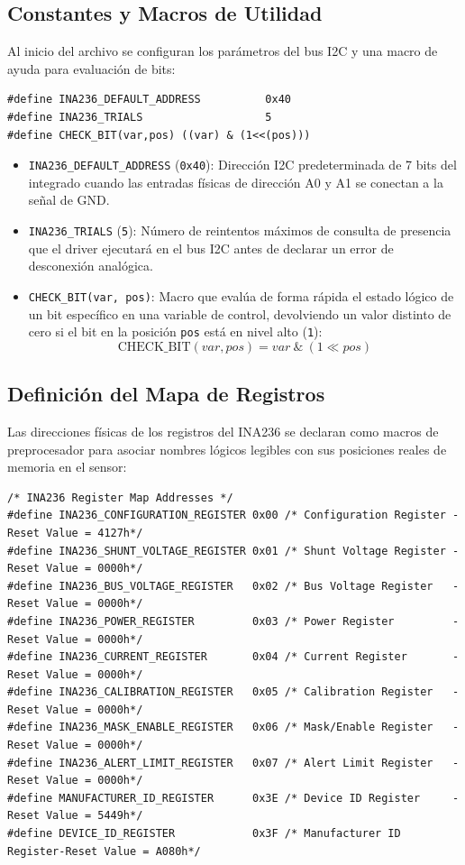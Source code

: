 \documentclass[
10pt, %
a4paper, %
oneside, %
headinclude,footinclude, %
BCOR5mm, %
]{scrartcl}
\begin{document}
\subsection{Constantes y Macros de Utilidad}
Al inicio del archivo se configuran los parámetros del bus I2C y una macro de ayuda para evaluación de bits:
\begin{lstlisting}[style=CMakeStyle]
#define INA236_DEFAULT_ADDRESS          0x40 
#define INA236_TRIALS                   5     
#define CHECK_BIT(var,pos) ((var) & (1<<(pos)))
\end{lstlisting}

\begin{itemize}
	\item \texttt{INA236\_DEFAULT\_ADDRESS} (\texttt{0x40}): Dirección I2C predeterminada de 7 bits del integrado cuando las entradas físicas de dirección A0 y A1 se conectan a la señal de GND.
	\item \texttt{INA236\_TRIALS} (\texttt{5}): Número de reintentos máximos de consulta de presencia que el driver ejecutará en el bus I2C antes de declarar un error de desconexión analógica.
	\item \texttt{CHECK\_BIT(var, pos)}: Macro que evalúa de forma rápida el estado lógico de un bit específico en una variable de control, devolviendo un valor distinto de cero si el bit en la posición \texttt{pos} está en nivel alto (\texttt{1}):
		\begin{equation}
			\text{CHECK\_BIT}(var, pos) = var \ \& \ (1 \ll pos)
		\end{equation}
\end{itemize}

\subsection{Definición del Mapa de Registros}
Las direcciones físicas de los registros del INA236 se declaran como macros de preprocesador para asociar nombres lógicos legibles con sus posiciones reales de memoria en el sensor:
\begin{lstlisting}[style=CMakeStyle]
/* INA236 Register Map Addresses */
#define INA236_CONFIGURATION_REGISTER 0x00 /* Configuration Register - Reset Value = 4127h*/
#define INA236_SHUNT_VOLTAGE_REGISTER 0x01 /* Shunt Voltage Register - Reset Value = 0000h*/
#define INA236_BUS_VOLTAGE_REGISTER   0x02 /* Bus Voltage Register   - Reset Value = 0000h*/
#define INA236_POWER_REGISTER         0x03 /* Power Register         - Reset Value = 0000h*/
#define INA236_CURRENT_REGISTER       0x04 /* Current Register       - Reset Value = 0000h*/
#define INA236_CALIBRATION_REGISTER   0x05 /* Calibration Register   - Reset Value = 0000h*/
#define INA236_MASK_ENABLE_REGISTER   0x06 /* Mask/Enable Register   - Reset Value = 0000h*/
#define INA236_ALERT_LIMIT_REGISTER   0x07 /* Alert Limit Register   - Reset Value = 0000h*/
#define MANUFACTURER_ID_REGISTER      0x3E /* Device ID Register     - Reset Value = 5449h*/  
#define DEVICE_ID_REGISTER            0x3F /* Manufacturer ID Register-Reset Value = A080h*/
\end{lstlisting}
\end{document}

